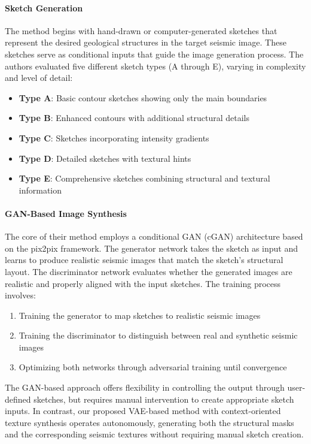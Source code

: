 \documentclass{ieeeaccess}
\begin{document}
\paragraph{Sketch Generation} The method begins with hand-drawn or computer-generated sketches that represent the desired geological structures in the target seismic image. These sketches serve as conditional inputs that guide the image generation process. The authors evaluated five different sketch types (A through E), varying in complexity and level of detail:
\begin{itemize}
    \item \textbf{Type A}: Basic contour sketches showing only the main boundaries
    \item \textbf{Type B}: Enhanced contours with additional structural details
    \item \textbf{Type C}: Sketches incorporating intensity gradients
    \item \textbf{Type D}: Detailed sketches with textural hints
    \item \textbf{Type E}: Comprehensive sketches combining structural and textural information
\end{itemize}
\paragraph{GAN-Based Image Synthesis} The core of their method employs a conditional GAN (cGAN) architecture based on the pix2pix framework. The generator network takes the sketch as input and learns to produce realistic seismic images that match the sketch's structural layout. The discriminator network evaluates whether the generated images are realistic and properly aligned with the input sketches. The training process involves:
\begin{enumerate}
    \item Training the generator to map sketches to realistic seismic images
    \item Training the discriminator to distinguish between real and synthetic seismic images
    \item Optimizing both networks through adversarial training until convergence
\end{enumerate}

The GAN-based approach offers flexibility in controlling the output through user-defined sketches, but requires manual intervention to create appropriate sketch inputs. In contrast, our proposed VAE-based method with context-oriented texture synthesis operates autonomously, generating both the structural masks and the corresponding seismic textures without requiring manual sketch creation.
\end{document}
